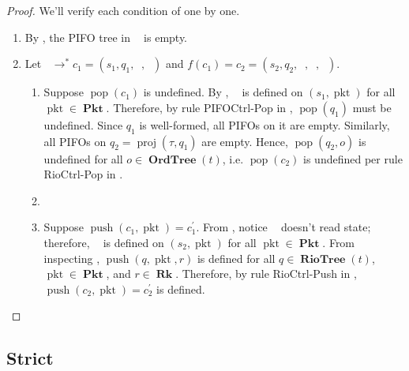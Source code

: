 \documentclass{amsart}
\DeclareMathOperator{\pkt}{\mathrm{pkt}}
\DeclareMathOperator{\push}{\mathrm{push}}
\DeclareMathOperator{\pop}{\mathrm{pop}}
\DeclareMathOperator{\proj}{\mathrm{proj}}
\DeclareMathOperator{\Pkt}{\mathbf{Pkt}}
\DeclareMathOperator{\Rk}{\mathbf{Rk}}
\DeclareMathOperator{\RioTree}{\mathbf{RioTree}}
\DeclareMathOperator{\OrdTree}{\mathbf{OrdTree}}
\DeclareMathOperator{\zprepush}{z_{\mathrm{pre-push}}}
\DeclareMathOperator{\zprepop}{z_{\mathrm{pre-pop}}}
\DeclareMathOperator{\zpostpop}{z_{\mathrm{post-pop}}}
\DeclareMathOperator{\tzprepush}{z^{\prime}_{\mathrm{pre-push}}}
\DeclareMathOperator{\crr}{c_{\text{RR}}}
\theoremstyle{definition}
\begin{document}
\begin{proof}
    We'll verify each condition of  one by one.
    \begin{enumerate}
        \item By , the PIFO tree in $\crr$ is empty.
        \item Let $\crr \to^\ast c_1 = (s_1, q_1, \zprepush, \zprepop)$ and $f(c_1) = c_2 = (s_2, q_2, \zprepush, \zprepop, \zpostpop)$.
            \begin{enumerate}
                \item Suppose $\pop(c_1)$ is undefined.
                    By , $\zpostpop$ is defined on $(s_1, \pkt)$ for all $\pkt \in \Pkt$.
                    Therefore, by rule PIFOCtrl-Pop in , $\pop(q_1)$ must be undefined.
                    Since $q_1$ is well-formed, all PIFOs on it are empty.
                    Similarly, all PIFOs on $q_2 = \proj(\tau, q_1)$ are empty.
                    Hence, $\pop(q_2, o)$ is undefined for all $o \in \OrdTree(t)$, i.e. $\pop(c_2)$ is undefined per rule RioCtrl-Pop in .

                \item

                \item Suppose $\push(c_1, \pkt) = c_1^\prime$.
                    From , notice $\tzprepush$ doesn't read state;
                    therefore, $\tzprepush$ is defined on $(s_2, \pkt)$ for all $\pkt \in \Pkt$.
                    From inspecting , $\push(q, \pkt, r)$ is defined for all $q \in \RioTree(t)$, $\pkt \in \Pkt$, and $r \in \Rk$.
                    Therefore, by rule RioCtrl-Push in , $\push(c_2, \pkt) = c_2^\prime$ is defined.
            \end{enumerate}
    \end{enumerate}
\end{proof}


\newpage

\subsection{Strict}

\newpage

\renewcommand\refname{\LARGE References}



\newpage
\end{document}
